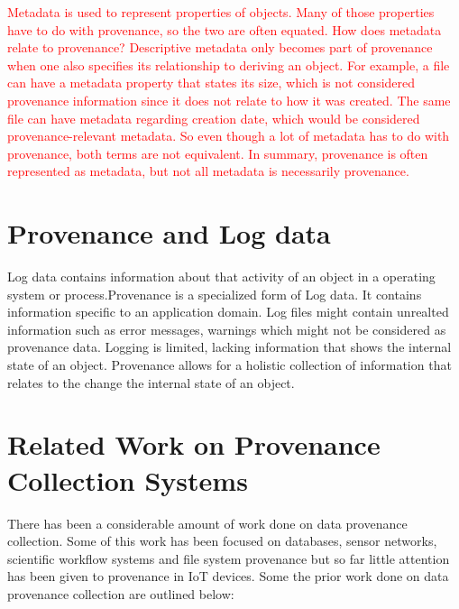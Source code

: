 \textcolor{red}{Metadata is used to represent properties of objects. Many of those properties have to do with provenance, so the two are often equated. How does metadata relate to provenance?
Descriptive metadata only becomes part of provenance when one also specifies its relationship to deriving an object. For example, a file can have a metadata property that states its size, which is not considered provenance information since it does not relate to how it was created. The same file can have metadata regarding creation date, which would be considered provenance-relevant metadata. So even though a lot of metadata has to do with provenance, both terms are not equivalent. In summary, provenance is often represented as metadata, but not all metadata is necessarily provenance.}


\section{Provenance and Log data}
Log data contains information about that activity of an object in a operating system or process.Provenance is a specialized form of Log data. It contains information specific to an application domain. Log files might contain unrealted information such as error messages, warnings which might not be considered as provenance data. Logging is limited, lacking information that shows the internal state of an object. Provenance allows for a holistic collection of information that relates to the change the internal state of an object.
\section{Related Work on Provenance Collection Systems}

There has been a considerable amount of work done on data provenance collection. Some of this work has been focused on databases, sensor networks, scientific workflow systems and file system provenance but so far little attention has been given to provenance in IoT devices. Some the prior work done on data provenance collection are outlined below:

